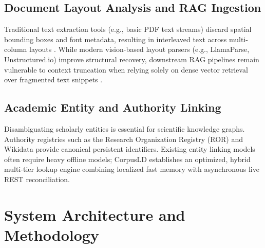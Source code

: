 \documentclass[conference]{IEEEtran}
\begin{document}
\subsection{Document Layout Analysis and RAG Ingestion}
Traditional text extraction tools (e.g., basic PDF text streams) discard spatial bounding boxes and font metadata, resulting in interleaved text across multi-column layouts \cite{layoutlmv3}. While modern vision-based layout parsers (e.g., LlamaParse, Unstructured.io) improve structural recovery, downstream RAG pipelines remain vulnerable to context truncation when relying solely on dense vector retrieval over fragmented text snippets \cite{lewis2020retrieval}.

\subsection{Academic Entity and Authority Linking}
Disambiguating scholarly entities is essential for scientific knowledge graphs. Authority registries such as the Research Organization Registry (ROR) \cite{ror2023} and Wikidata \cite{vrandecic2014wikidata} provide canonical persistent identifiers. Existing entity linking models often require heavy offline models; CorpusLD establishes an optimized, hybrid multi-tier lookup engine combining localized fast memory with asynchronous live REST reconciliation.

\section{System Architecture and Methodology}
\end{document}
